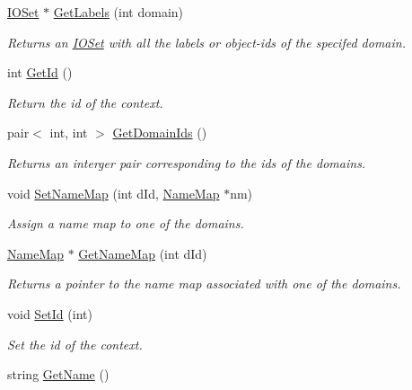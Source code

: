 \begin{DoxyCompactItemize}
\hyperlink{class_i_o_set}{IOSet} $\ast$ \hyperlink{class_context_a980ed3eb69cc388465263025203cf1c8}{GetLabels} (int domain)
\begin{DoxyCompactList}\small\item\em Returns an \hyperlink{class_i_o_set}{IOSet} with all the labels or object-\/ids of the specifed domain. \item\end{DoxyCompactList}\item 
int \hyperlink{class_context_a25534dd063517e00875840cd53c2bacd}{GetId} ()
\begin{DoxyCompactList}\small\item\em Return the id of the context. \item\end{DoxyCompactList}\item 
pair$<$ int, int $>$ \hyperlink{class_context_abf904165924eb0b4b0e3bf580859903a}{GetDomainIds} ()
\begin{DoxyCompactList}\small\item\em Returns an interger pair corresponding to the ids of the domains. \item\end{DoxyCompactList}\item 
void \hyperlink{class_context_afb2aabeb42abb6e561a9ea898520baef}{SetNameMap} (int dId, \hyperlink{class_name_map}{NameMap} $\ast$nm)
\begin{DoxyCompactList}\small\item\em Assign a name map to one of the domains. \item\end{DoxyCompactList}\item 
\hyperlink{class_name_map}{NameMap} $\ast$ \hyperlink{class_context_af00dbb1f5b5fa02eea8e2e326e297bb9}{GetNameMap} (int dId)
\begin{DoxyCompactList}\small\item\em Returns a pointer to the name map associated with one of the domains. \item\end{DoxyCompactList}\item 
void \hyperlink{class_context_ae0f9d4005435ecb3c5f01002eec2f15e}{SetId} (int)
\begin{DoxyCompactList}\small\item\em Set the id of the context. \item\end{DoxyCompactList}\item 
string \hyperlink{class_context_af745b4bd53e87f9413288378b9dba2ba}{GetName} ()

\end{DoxyCompactItemize}
